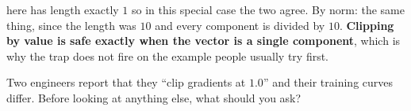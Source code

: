 \begin{furtherproblems}
{  here has length exactly $1$ \dash{} so in this special case the two agree.
  By norm: the same thing, since the length was $10$ and every component is
  divided by $10$. \textbf{Clipping by value is safe exactly when the vector
  is a single component}, which is why the trap does not fire on the example
  people usually try first.}
\item Two engineers report that they \enquote{clip gradients at $\num{1.0}$}
  and their training curves differ. Before looking at anything else, what
  should you ask?
\end{furtherproblems}
